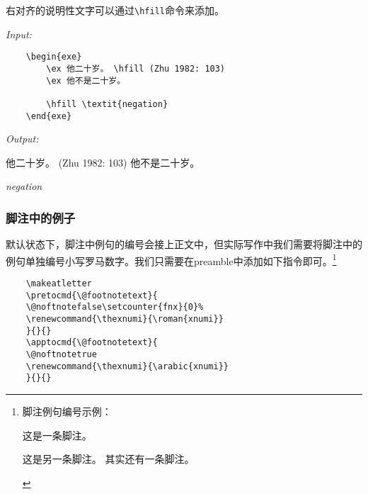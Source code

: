 \documentclass[a4paper,12pt]{article}
\begin{document}

\vspace{3mm}
右对齐的说明性文字可以通过\verb|\hfill|命令来添加。

\vspace{3mm}
\textit{Input:}
\begin{Verbatim}
	\begin{exe}
		\ex 他二十岁。 \hfill (Zhu 1982: 103)
		\ex 他不是二十岁。 
		
		\hfill \textit{negation}
	\end{exe}
\end{Verbatim}

\vspace{3mm}
\textit{Output:}
\begin{exe}
	\ex 他二十岁。 \hfill (Zhu 1982: 103)
	\ex 他不是二十岁。 
	
	\hfill \textit{negation}
\end{exe}

\subsubsection{脚注中的例子}
默认状态下，脚注中例句的编号会接上正文中，但实际写作中我们需要将脚注中的例句单独编号小写罗马数字。我们只需要在preamble中添加如下指令即可。\footnote{脚注例句编号示例：
	
\begin{exe}
	\ex 这是一条脚注。
	\ex 
		\begin{xlist}
			\ex 这是另一条脚注。
			\ex 其实还有一条脚注。
		\end{xlist}
\end{exe}

}

\vspace{3mm}	
\begin{verbatim}
	\makeatletter
	\pretocmd{\@footnotetext}{
	\@noftnotefalse\setcounter{fnx}{0}%
	\renewcommand{\thexnumi}{\roman{xnumi}}
	}{}{}
	\apptocmd{\@footnotetext}{
	\@noftnotetrue
	\renewcommand{\thexnumi}{\arabic{xnumi}}
	}{}{}
\end{verbatim}

%
%
%
%
%
\end{document}
